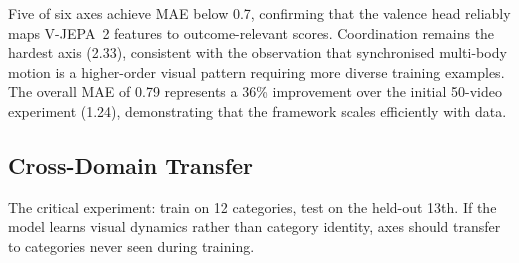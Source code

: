 \documentclass[11pt]{article}
\begin{document}
Five of six axes achieve MAE below 0.7, confirming that the valence head reliably maps V-JEPA~2 features to outcome-relevant scores. Coordination remains the hardest axis (2.33), consistent with the observation that synchronised multi-body motion is a higher-order visual pattern requiring more diverse training examples. The overall MAE of 0.79 represents a 36\% improvement over the initial 50-video experiment (1.24), demonstrating that the framework scales efficiently with data.

\subsection{Cross-Domain Transfer}

The critical experiment: train on 12 categories, test on the held-out 13th. If the model learns visual dynamics rather than category identity, axes should transfer to categories never seen during training.
\end{document}
